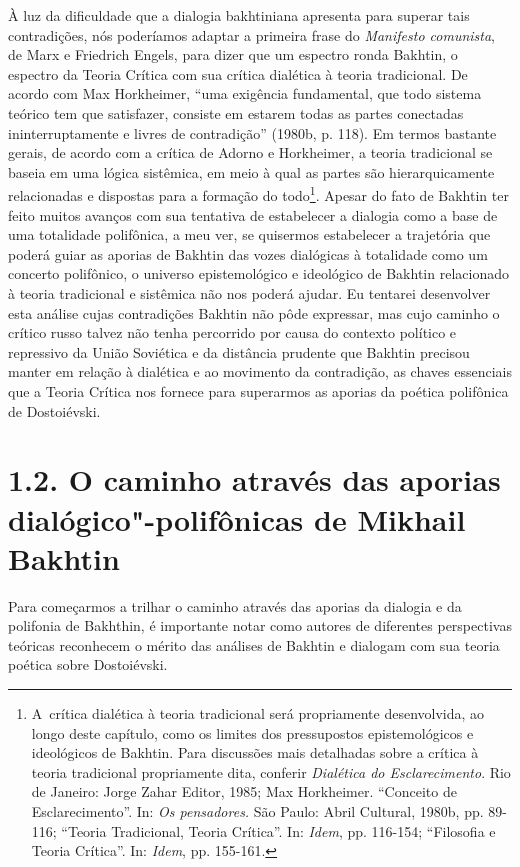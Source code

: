 À luz da dificuldade que a dialogia bakhtiniana apresenta para superar
tais contradições, nós poderíamos adaptar a primeira frase do
\emph{Manifesto comunista}, de Marx e Friedrich Engels, para dizer que
um espectro ronda Bakhtin, o espectro da Teoria Crítica com sua crítica
dialética à teoria tradicional. De acordo com Max Horkheimer, ``uma
exigência fundamental, que todo sistema teórico tem que satisfazer,
consiste em estarem todas as partes conectadas ininterruptamente e
livres de contradição'' (1980b, p. 118). Em termos bastante gerais, de
acordo com a crítica de Adorno e Horkheimer, a teoria tradicional se
baseia em uma lógica sistêmica, em meio à qual as partes são
hierarquicamente relacionadas e dispostas para a formação do
todo\footnote{A~crítica dialética à teoria tradicional será propriamente
  desenvolvida, ao longo deste capítulo, como os limites dos
  pressupostos epistemológicos e ideológicos de Bakhtin. Para discussões
  mais detalhadas sobre a crítica à teoria tradicional propriamente
  dita, conferir \emph{Dialética do Esclarecimento}. Rio de Janeiro:
  Jorge Zahar Editor, 1985; Max Horkheimer. ``Conceito de
  Esclarecimento''. In: \emph{Os pensadores.} São Paulo: Abril Cultural,
  1980b, pp. 89-116; ``Teoria Tradicional, Teoria Crítica''. In:
  \emph{Idem}, pp. 116-154; ``Filosofia e Teoria Crítica''. In:
  \emph{Idem}, pp. 155-161.}. Apesar do fato de Bakhtin ter feito muitos
avanços com sua tentativa de estabelecer a dialogia como a base de uma
totalidade polifônica, a meu ver, se quisermos estabelecer a trajetória
que poderá guiar as aporias de Bakhtin das vozes dialógicas à totalidade
como um concerto polifônico, o universo epistemológico e ideológico de
Bakhtin relacionado à teoria tradicional e sistêmica não nos poderá
ajudar. Eu tentarei desenvolver esta análise cujas contradições Bakhtin
não pôde expressar, mas cujo caminho o crítico russo talvez não tenha
percorrido por causa do contexto político e repressivo da União
Soviética e da distância prudente que Bakhtin precisou manter em relação
à dialética e ao movimento da contradição, as chaves essenciais que a
Teoria Crítica nos fornece para superarmos as aporias da poética
polifônica de Dostoiévski.

\section{1.2. O caminho através das aporias dialógico"-polifônicas de Mikhail
Bakhtin}

Para começarmos a trilhar o caminho através das aporias da dialogia e da
polifonia de Bakhthin, é importante notar como autores de diferentes
perspectivas teóricas reconhecem o mérito das análises de Bakhtin e
dialogam com sua teoria poética sobre Dostoiévski.

